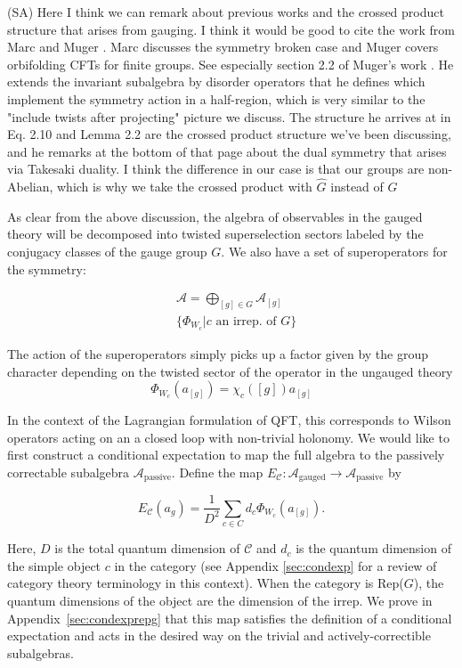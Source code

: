 \documentclass{article}
\newcommand{\mA}{\mathcal{A}}
\newcommand{\mC}{\mathcal{C}}
\theoremstyle{definition}
\newcommand{\SA}[1]{{\color{sulaiman}\footnotesize{(SA) #1}}}
\begin{document}
  \SA{Here I think we can remark about previous works and the crossed product structure that arises from gauging. I think it would be good to cite the work from Marc \cite{klinger2025theory} and Muger \cite{Muger2005conformalorbifold, muger1999soliton}. Marc discusses the symmetry broken case and Muger covers orbifolding CFTs for finite groups. See especially section 2.2 of Muger's work \cite{muger1999soliton}. He extends the invariant subalgebra by disorder operators that he defines which implement the symmetry action in a half-region, which is very similar to the "include twists after projecting" picture we discuss. The structure he arrives at in Eq. 2.10 and Lemma 2.2 are the crossed product structure we've been discussing, and he remarks at the bottom of that page about the dual symmetry that arises via Takesaki duality. I think the difference in our case is that our groups are non-Abelian, which is why we take the crossed product with $\hat{G}$ instead of $G$}

  As clear from the above discussion, the algebra of observables in the gauged
  theory will be decomposed into twisted superselection sectors labeled by the
  conjugacy classes of the gauge group $G$. We also have a set of superoperators
  for the symmetry:

  \begin{eqnarray}
    &\mA = \bigoplus_{[g] \in G} \mA_{[g]}\\
    &\{\Phi_{W_c}| \text{$c$ an irrep. of $G$}\}
  \end{eqnarray}

  The action of the superoperators simply picks up a factor given by the group
  character depending on the twisted sector of the operator in the ungauged
  theory
  \[
    \Phi_{W_c}(a_{[g]}) = \chi_{c}([g])a_{[g]}
  \]

  In the context of the Lagrangian formulation of QFT, this corresponds to
  Wilson operators acting on an a closed loop with non-trivial holonomy. We would
  like to first construct a conditional expectation to map the full algebra to the
  passively correctable subalgebra $\mA_{\text{passive}}$. Define the map
  $E_{\mC}:\mA_{\text{gauged}}\to\mA_{\text{passive}}$ by

  \begin{equation}
    \label{eq:E-def-RepG}E_{\mC}(a_{g})=\frac{1}{D^{2}}\sum_{c\in C}d_{c}\Phi_{W_c}
    (a_{[g]}).
  \end{equation}

  Here, $D$ is the total quantum dimension of $\mC$ and $d_{c}$ is the quantum dimension
  of the simple object $c$ in the category (see Appendix \ref{sec:condexp} for a
  review of category theory terminology in this context). When the category is
  Rep($G$), the quantum dimensions of the object are the dimension of the irrep.
  We prove in Appendix~\ref{sec:condexprepg} that this map satisfies the definition
  of a conditional expectation and acts in the desired way on the trivial and actively-correctible
  subalgebras.
\end{document}
